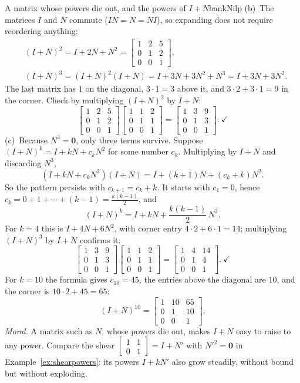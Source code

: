 \documentclass[11pt]{article}
\begin{document}
\begin{exmp}{A matrix whose powers die out, and the powers of $I+N$}{bankNilp}
(b)~The matrices $I$ and $N$ commute ($IN=N=NI$), so expanding does not require reordering anything:
\begin{align*}
&(I+N)^2=I+2N+N^2=\begin{bmatrix}1&2&5\\0&1&2\\0&0&1\end{bmatrix},\\
&(I+N)^3=(I+N)^2(I+N)=I+3N+3N^2+N^3=I+3N+3N^2.
\end{align*}
The last matrix has $1$ on the diagonal, $3\cdot1=3$ above it, and $3\cdot2+3\cdot1=9$ in the corner. Check by multiplying $(I+N)^2$ by $I+N$:
\[
\begin{bmatrix}1&2&5\\0&1&2\\0&0&1\end{bmatrix}\begin{bmatrix}1&1&2\\0&1&1\\0&0&1\end{bmatrix}=\begin{bmatrix}1&3&9\\0&1&3\\0&0&1\end{bmatrix}.\ \checkmark
\]
(c)~Because $N^3=\mathbf{0}$, only three terms survive. Suppose $(I+N)^k=I+kN+c_kN^2$ for some number $c_k$. Multiplying by $I+N$ and discarding $N^3$,
\[
(I+kN+c_kN^2)(I+N)=I+(k+1)N+(c_k+k)N^2.
\]
So the pattern persists with $c_{k+1}=c_k+k$. It starts with $c_1=0$, hence $c_k=0+1+\cdots+(k-1)=\frac{k(k-1)}{2}$, and
\[
(I+N)^k=I+kN+\frac{k(k-1)}2\,N^2 .
\]
For $k=4$ this is $I+4N+6N^2$, with corner entry $4\cdot2+6\cdot1=14$; multiplying $(I+N)^3$ by $I+N$ confirms it:
\[
\begin{bmatrix}1&3&9\\0&1&3\\0&0&1\end{bmatrix}\begin{bmatrix}1&1&2\\0&1&1\\0&0&1\end{bmatrix}=\begin{bmatrix}1&4&14\\0&1&4\\0&0&1\end{bmatrix}.\ \checkmark
\]
For $k=10$ the formula gives $c_{10}=45$, the entries above the diagonal are $10$, and the corner is $10\cdot2+45=65$:
\[
(I+N)^{10}=\begin{bmatrix}1&10&65\\0&1&10\\0&0&1\end{bmatrix}.
\]
\emph{Moral.} A matrix such as $N$, whose powers die out, makes $I+N$ easy to raise to any power. Compare the shear $\begin{bmatrix}1&1\\0&1\end{bmatrix}=I+N'$ with $N'^2=\mathbf{0}$ in Example~\ref{ex:shearpowers}: its powers $I+kN'$ also grow steadily, without bound but without exploding.
\end{exmp}
\end{document}

